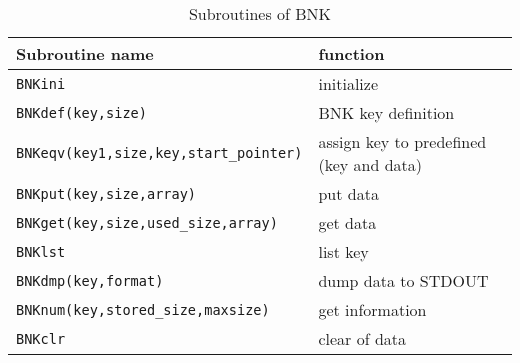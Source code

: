 \begin{table}[hbt]
\begin{tabular}{ll} \hline
Subroutine name & function \\ \hline
{\tt BNKini} & initialize \\
{\tt BNKdef(key,size)}  & BNK key definition \\
{\tt BNKeqv(key1,size,key,start\_pointer)} &
assign key to predefined (key and data) \\
{\tt BNKput(key,size,array)} & put data \\
{\tt BNKget(key,size,used\_size,array)} & get data \\
{\tt BNKlst} & list key \\
{\tt BNKdmp(key,format)} & dump data to STDOUT \\
{\tt BNKnum(key,stored\_size,maxsize)} & get information \\
{\tt BNKclr} & clear of data \\ \hline 
\end{tabular}
\caption{Subroutines of BNK}
\label{tab:bnk_subroutine}
\end{table}


